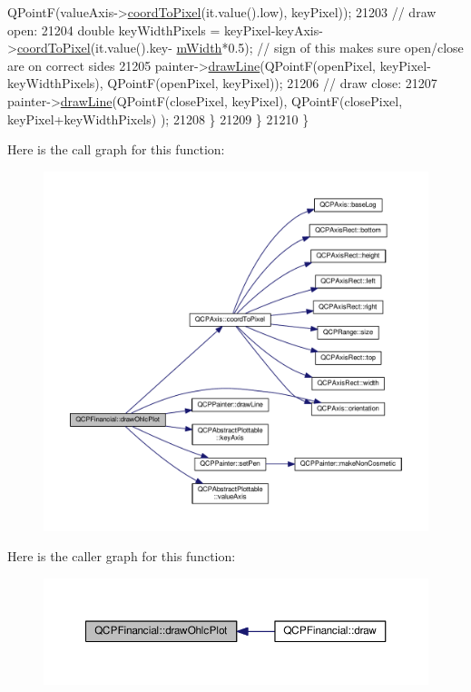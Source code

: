 \begin{DoxyCode}
      QPointF(valueAxis->\hyperlink{class_q_c_p_axis_a985ae693b842fb0422b4390fe36d299a}{coordToPixel}(it.value().low), keyPixel));
21203       \textcolor{comment}{// draw open:}
21204       \textcolor{keywordtype}{double} keyWidthPixels = keyPixel-keyAxis->\hyperlink{class_q_c_p_axis_a985ae693b842fb0422b4390fe36d299a}{coordToPixel}(it.value().key-
      \hyperlink{class_q_c_p_financial_af630e5eb8485146b9c777e63fd1cf993}{mWidth}*0.5); \textcolor{comment}{// sign of this makes sure open/close are on correct sides}
21205       painter->\hyperlink{class_q_c_p_painter_a0b4b1b9bd495e182c731774dc800e6e0}{drawLine}(QPointF(openPixel, keyPixel-keyWidthPixels), QPointF(openPixel, keyPixel));
21206       \textcolor{comment}{// draw close:}
21207       painter->\hyperlink{class_q_c_p_painter_a0b4b1b9bd495e182c731774dc800e6e0}{drawLine}(QPointF(closePixel, keyPixel), QPointF(closePixel, keyPixel+keyWidthPixels)
      );
21208     \}
21209   \}
21210 \}
\end{DoxyCode}


Here is the call graph for this function\+:\nopagebreak
\begin{figure}[H]
\begin{center}
\leavevmode
\includegraphics[width=350pt]{class_q_c_p_financial_a3c3007a7434e29d042c77ccf4f497e66_cgraph}
\end{center}
\end{figure}




Here is the caller graph for this function\+:\nopagebreak
\begin{figure}[H]
\begin{center}
\leavevmode
\includegraphics[width=350pt]{class_q_c_p_financial_a3c3007a7434e29d042c77ccf4f497e66_icgraph}
\end{center}
\end{figure}


